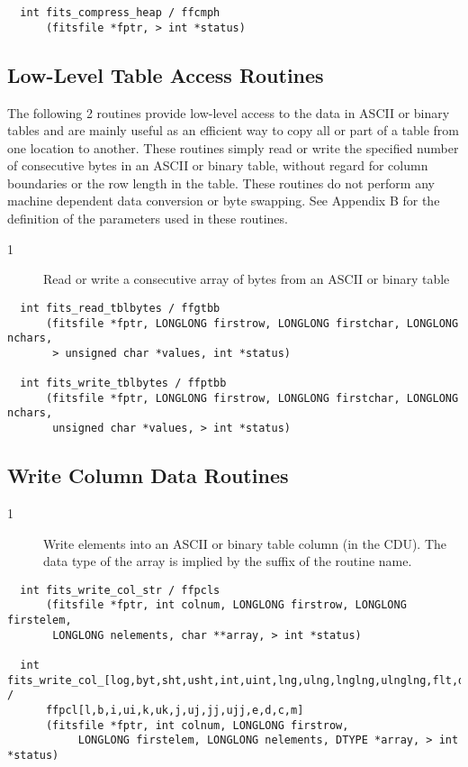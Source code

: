 \documentclass[11pt]{book}
\begin{document}
\begin{verbatim}
  int fits_compress_heap / ffcmph
      (fitsfile *fptr, > int *status)
\end{verbatim}


\subsection{Low-Level Table Access Routines}

The following 2 routines provide low-level access to the data in ASCII
or binary tables and are mainly useful as an efficient way to copy all
or part of a table from one location to another.  These routines simply
read or write the specified number of consecutive bytes in an ASCII or
binary table, without regard for column boundaries or the row length in
the table.  These routines do not perform any machine dependent data
conversion or byte swapping.  See Appendix B for the definition of the
parameters used in these routines.


\begin{description}
\item[1 ] Read or write a consecutive array of bytes from an ASCII or binary
   table \label{ffgtbb}  \label{ffptbb}
\end{description}

\begin{verbatim}
  int fits_read_tblbytes / ffgtbb
      (fitsfile *fptr, LONGLONG firstrow, LONGLONG firstchar, LONGLONG nchars,
       > unsigned char *values, int *status)

  int fits_write_tblbytes / ffptbb
      (fitsfile *fptr, LONGLONG firstrow, LONGLONG firstchar, LONGLONG nchars,
       unsigned char *values, > int *status)
\end{verbatim}


\subsection{Write Column Data Routines}


\begin{description}
\item[1 ] Write elements into an ASCII or binary table column (in the CDU).
    The data type of the array is implied by the suffix of the
   routine name. \label{ffpcls}
\end{description}

\begin{verbatim}
  int fits_write_col_str / ffpcls
      (fitsfile *fptr, int colnum, LONGLONG firstrow, LONGLONG firstelem,
       LONGLONG nelements, char **array, > int *status)

  int fits_write_col_[log,byt,sht,usht,int,uint,lng,ulng,lnglng,ulnglng,flt,dbl,cmp,dblcmp] /
      ffpcl[l,b,i,ui,k,uk,j,uj,jj,ujj,e,d,c,m]
      (fitsfile *fptr, int colnum, LONGLONG firstrow,
           LONGLONG firstelem, LONGLONG nelements, DTYPE *array, > int *status)
\end{verbatim}
\end{document}

